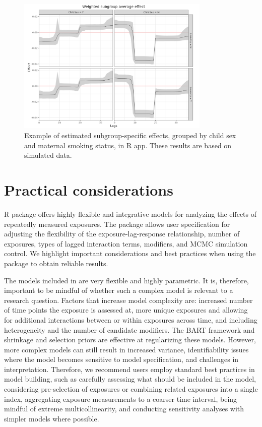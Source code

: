 \begin{figure}[ht]
    \centering
    \includegraphics[width=0.82\textwidth]{images/HDLM_Shiny4.png}
    \caption{Example of estimated subgroup-specific effects, grouped by child sex and maternal smoking status, in R  app. These results are based on simulated data.}
    \label{fig:hdlm_shiny4}
\end{figure}


\section{Practical considerations}\label{sec:practical}
R package  offers highly flexible and integrative models for analyzing the effects of repeatedly measured exposures. The package allows user specification for adjusting the flexibility of the exposure-lag-response relationship, number of exposures, types of lagged interaction terms, modifiers, and MCMC simulation control. We highlight important considerations and best practices when using the package to obtain reliable results.

The models included in  are very flexible and highly parametric. It is, therefore, important to be mindful of whether such a complex model is relevant to a research question. Factors that increase model complexity are: increased number of time points the exposure is assessed at, more unique exposures and allowing for additional interactions between or within exposures across time, and including heterogeneity and the number of candidate modifiers. The BART framework and shrinkage and selection priors are effective at regularizing these models. However, more complex models can still result in increased variance, identifiability issues where the model becomes sensitive to model specification, and challenges in interpretation. Therefore, we recommend users employ standard best practices in model building, such as carefully assessing what should be included in the model, considering pre-selection of exposures or combining related exposures into a single index, aggregating exposure measurements to a coarser time interval, being mindful of extreme multicollinearity, and conducting sensitivity analyses with simpler models where possible.

